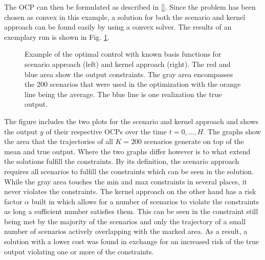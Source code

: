 The OCP can then be formulated as described in \ref{}. Since the problem has been chosen as convex in this example, a solution for both the scenario and kernel approach can be found easily by using a convex solver. The results of an exemplary run is shown in Fig. \ref{ScenarioKernelComparison}. 

\begin{figure}[htb]
\centering
{}
\quad %
\caption{Example of the optimal control with known basis functions for scenario approach (left) and kernel approach (right). The red and blue area show the output constraints. The gray area encompasses the 200 scenarios that were used in the optimization with the orange line being the average. The blue line is one realization the true output.}
\label{ScenarioKernelComparison}
\end{figure}

The figure includes the two plots for the scenario and kernel approach and shows the output $y$ of their respective OCPs over the time $t = 0, ..., H$. The graphs show the area that the trajectories of all $K = 200$ scenarios generate on top of the mean and true output. Where the two graphs differ however is to what extend the solutions fulfill the constraints. By its definition, the scenario approach requires all scenarios to fulfill the constraints which can be seen in the solution. While the gray area touches the min and max constraints in several places, it never violates the constraints. The kernel approach on the other hand has a risk factor $\alpha$ built in which allows for a number of scenarios to violate the constraints as long a sufficient number satisfies them. This can be seen in the constraint still being met by the majority of the scenarios and only the trajectory of a small number of scenarios actively overlapping with the marked area. As a result, a solution with a lower cost was found in exchange for an increased risk of the true output violating one or more of the constraints.




